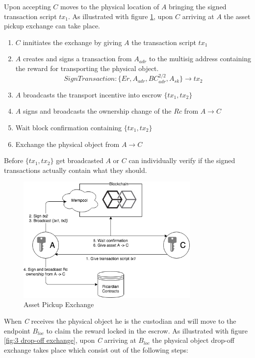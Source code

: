 Upon accepting $C$ moves to the physical location of $A$ bringing the signed transaction script $tx_1$. As illustrated with figure \ref{fig:2 first exchange}, upon $C$ arriving at $A$ the asset pickup exchange can take place.

\begin{enumerate}
  \item $C$ innitiates the exchange by giving $A$ the transaction script $tx_1$
  \item $A$ creates and signs a transaction from $A_{adr}$ to the multisig address containing the reward for transporting the physical object.
  \[SignTransaction \colon \{Er, A_{adr}, BC_{adr}^{2/2}, A_{sk}\} \rightarrow tx_2\]
  \item $A$ broadcasts the transport incentive into escrow $\{tx_1, tx_2\}$
  \item $A$ signs and broadcasts the ownership change of the $Rc$ from $A\rightarrow C$
  \item Wait block confirmation containing $\{tx_1, tx_2\}$
  \item Exchange the physical object from $A\rightarrow C$
\end{enumerate}

Before $\{tx_1, tx_2\}$ get broadcasted $A$ or $C$ can individually verify if the signed transactions actually contain what they should.

\begin{figure}[h]
\centering
\includegraphics[width=0.8\textwidth]{images/exchange_01.png}
\caption{Asset Pickup Exchange}
\label{fig:2 first exchange}
\end{figure}

 When \textit{C} receives the physical object he is the custodian and will move to the endpoint $B_{loc}$ to claim the reward locked in the escrow. As illustrated with figure \ref{fig:3 drop-off exchange}, upon \textit{C} arriving at $B_{loc}$ the physical object drop-off exchange takes place which consist out of the following steps:

